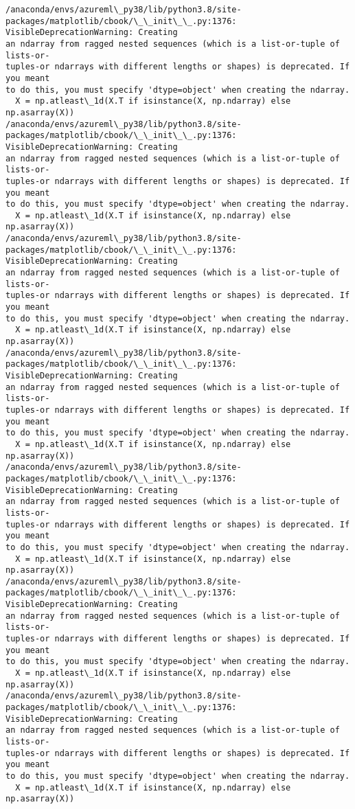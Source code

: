 \documentclass[11pt]{article}
\begin{document}
    \begin{Verbatim}[commandchars=\\\{\}]
/anaconda/envs/azureml\_py38/lib/python3.8/site-
packages/matplotlib/cbook/\_\_init\_\_.py:1376: VisibleDeprecationWarning: Creating
an ndarray from ragged nested sequences (which is a list-or-tuple of lists-or-
tuples-or ndarrays with different lengths or shapes) is deprecated. If you meant
to do this, you must specify 'dtype=object' when creating the ndarray.
  X = np.atleast\_1d(X.T if isinstance(X, np.ndarray) else np.asarray(X))
/anaconda/envs/azureml\_py38/lib/python3.8/site-
packages/matplotlib/cbook/\_\_init\_\_.py:1376: VisibleDeprecationWarning: Creating
an ndarray from ragged nested sequences (which is a list-or-tuple of lists-or-
tuples-or ndarrays with different lengths or shapes) is deprecated. If you meant
to do this, you must specify 'dtype=object' when creating the ndarray.
  X = np.atleast\_1d(X.T if isinstance(X, np.ndarray) else np.asarray(X))
/anaconda/envs/azureml\_py38/lib/python3.8/site-
packages/matplotlib/cbook/\_\_init\_\_.py:1376: VisibleDeprecationWarning: Creating
an ndarray from ragged nested sequences (which is a list-or-tuple of lists-or-
tuples-or ndarrays with different lengths or shapes) is deprecated. If you meant
to do this, you must specify 'dtype=object' when creating the ndarray.
  X = np.atleast\_1d(X.T if isinstance(X, np.ndarray) else np.asarray(X))
/anaconda/envs/azureml\_py38/lib/python3.8/site-
packages/matplotlib/cbook/\_\_init\_\_.py:1376: VisibleDeprecationWarning: Creating
an ndarray from ragged nested sequences (which is a list-or-tuple of lists-or-
tuples-or ndarrays with different lengths or shapes) is deprecated. If you meant
to do this, you must specify 'dtype=object' when creating the ndarray.
  X = np.atleast\_1d(X.T if isinstance(X, np.ndarray) else np.asarray(X))
/anaconda/envs/azureml\_py38/lib/python3.8/site-
packages/matplotlib/cbook/\_\_init\_\_.py:1376: VisibleDeprecationWarning: Creating
an ndarray from ragged nested sequences (which is a list-or-tuple of lists-or-
tuples-or ndarrays with different lengths or shapes) is deprecated. If you meant
to do this, you must specify 'dtype=object' when creating the ndarray.
  X = np.atleast\_1d(X.T if isinstance(X, np.ndarray) else np.asarray(X))
/anaconda/envs/azureml\_py38/lib/python3.8/site-
packages/matplotlib/cbook/\_\_init\_\_.py:1376: VisibleDeprecationWarning: Creating
an ndarray from ragged nested sequences (which is a list-or-tuple of lists-or-
tuples-or ndarrays with different lengths or shapes) is deprecated. If you meant
to do this, you must specify 'dtype=object' when creating the ndarray.
  X = np.atleast\_1d(X.T if isinstance(X, np.ndarray) else np.asarray(X))
/anaconda/envs/azureml\_py38/lib/python3.8/site-
packages/matplotlib/cbook/\_\_init\_\_.py:1376: VisibleDeprecationWarning: Creating
an ndarray from ragged nested sequences (which is a list-or-tuple of lists-or-
tuples-or ndarrays with different lengths or shapes) is deprecated. If you meant
to do this, you must specify 'dtype=object' when creating the ndarray.
  X = np.atleast\_1d(X.T if isinstance(X, np.ndarray) else np.asarray(X))
    \end{Verbatim}
\end{document}
